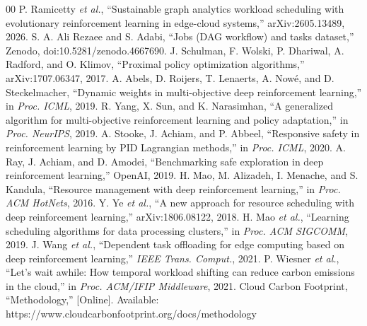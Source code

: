 \documentclass[conference]{IEEEtran}
\begin{document}
\begin{thebibliography}{00}
 P. Ramicetty \emph{et al.}, ``Sustainable graph analytics workload scheduling with evolutionary reinforcement learning in edge-cloud systems,'' arXiv:2605.13489, 2026.
 S. A. Ali Rezaee and S. Adabi, ``Jobs (DAG workflow) and tasks dataset,'' Zenodo, doi:10.5281/zenodo.4667690.
 J. Schulman, F. Wolski, P. Dhariwal, A. Radford, and O. Klimov, ``Proximal policy optimization algorithms,'' arXiv:1707.06347, 2017.
 A. Abels, D. Roijers, T. Lenaerts, A. Now\'e, and D. Steckelmacher, ``Dynamic weights in multi-objective deep reinforcement learning,'' in \emph{Proc. ICML}, 2019.
 R. Yang, X. Sun, and K. Narasimhan, ``A generalized algorithm for multi-objective reinforcement learning and policy adaptation,'' in \emph{Proc. NeurIPS}, 2019.
 A. Stooke, J. Achiam, and P. Abbeel, ``Responsive safety in reinforcement learning by PID Lagrangian methods,'' in \emph{Proc. ICML}, 2020.
 A. Ray, J. Achiam, and D. Amodei, ``Benchmarking safe exploration in deep reinforcement learning,'' OpenAI, 2019.
 H. Mao, M. Alizadeh, I. Menache, and S. Kandula, ``Resource management with deep reinforcement learning,'' in \emph{Proc. ACM HotNets}, 2016.
 Y. Ye \emph{et al.}, ``A new approach for resource scheduling with deep reinforcement learning,'' arXiv:1806.08122, 2018.
 H. Mao \emph{et al.}, ``Learning scheduling algorithms for data processing clusters,'' in \emph{Proc. ACM SIGCOMM}, 2019.
 J. Wang \emph{et al.}, ``Dependent task offloading for edge computing based on deep reinforcement learning,'' \emph{IEEE Trans. Comput.}, 2021.
 P. Wiesner \emph{et al.}, ``Let's wait awhile: How temporal workload shifting can reduce carbon emissions in the cloud,'' in \emph{Proc. ACM/IFIP Middleware}, 2021.
 Cloud Carbon Footprint, ``Methodology,'' [Online]. Available: https://www.cloudcarbonfootprint.org/docs/methodology
\end{thebibliography}
\end{document}
